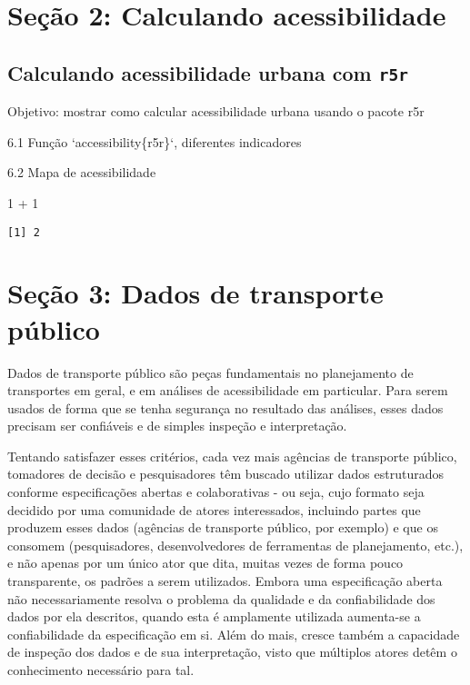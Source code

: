 \documentclass[
  letterpaper,
  DIV=11,
  numbers=noendperiod]{scrreprt}
\newenvironment{Shaded}{\begin{snugshade}}{\end{snugshade}}
\newcommand{\DecValTok}[1]{\textcolor[rgb]{0.68,0.00,0.00}{#1}}
\newcommand{\SpecialCharTok}[1]{\textcolor[rgb]{0.37,0.37,0.37}{#1}}
\begin{document}
\part{Seção 2: Calculando acessibilidade}

\hypertarget{calculando-acessibilidade-urbana-com-r5r}{%
\chapter{\texorpdfstring{Calculando acessibilidade urbana com
\texttt{r5r}}{Calculando acessibilidade urbana com r5r}}\label{calculando-acessibilidade-urbana-com-r5r}}

Objetivo: mostrar como calcular acessibilidade urbana usando o pacote
r5r

6.1 Função `accessibility\{r5r\}`, diferentes indicadores

6.2 Mapa de acessibilidade

\begin{Shaded}
\begin{Highlighting}[]
\DecValTok{1} \SpecialCharTok{+} \DecValTok{1}
\end{Highlighting}
\end{Shaded}

\begin{verbatim}
[1] 2
\end{verbatim}

\part{Seção 3: Dados de transporte público}

Dados de transporte público são peças fundamentais no planejamento de
transportes em geral, e em análises de acessibilidade em particular.
Para serem usados de forma que se tenha segurança no resultado das
análises, esses dados precisam ser confiáveis e de simples inspeção e
interpretação.

Tentando satisfazer esses critérios, cada vez mais agências de
transporte público, tomadores de decisão e pesquisadores têm buscado
utilizar dados estruturados conforme especificações abertas e
colaborativas - ou seja, cujo formato seja decidido por uma comunidade
de atores interessados, incluindo partes que produzem esses dados
(agências de transporte público, por exemplo) e que os consomem
(pesquisadores, desenvolvedores de ferramentas de planejamento, etc.), e
não apenas por um único ator que dita, muitas vezes de forma pouco
transparente, os padrões a serem utilizados. Embora uma especificação
aberta não necessariamente resolva o problema da qualidade e da
confiabilidade dos dados por ela descritos, quando esta é amplamente
utilizada aumenta-se a confiabilidade da especificação em si. Além do
mais, cresce também a capacidade de inspeção dos dados e de sua
interpretação, visto que múltiplos atores detêm o conhecimento
necessário para tal.
\end{document}
